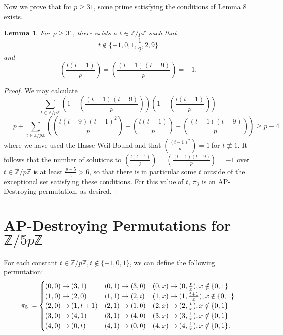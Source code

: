 \documentclass[12pt]{amsart}
\newtheorem{lemma}[thm]{Lemma}
\theoremstyle{definition}
\theoremstyle{remark}
\newcommand{\Z}{\mathbb Z}
\begin{document}
Now we prove that for $p\ge 31$, some prime satisfying the conditions of Lemma 8 exists. 
\begin{lemma}
For $p\ge 31$, there exists a $t\in \Z/p\Z$ such that
\[t\notin \{-1, 0, 1, \frac{1}{2}, 2, 9\}\]
and 
\[(\frac{t(t-1)}{p})=(\frac{(t-1)(t-9)}{p})=-1.\]
\end{lemma}
\begin{proof}
We may calculate
\[
\sum_{t\in\Z/p\Z}(1-(\frac{(t-1)(t-9)}{p}))(1-(\frac{t(t-1)}{p}))\]\[= p+\sum_{t\in\Z/p\Z}((\frac{t(t-9)(t-1)^2}{p})-(\frac{t(t-1)}{p})-(\frac{(t-1)(t-9)}{p}))\ge p-4
\]
where we have used the Hasse-Weil Bound and that $(\frac{(t-1)^2}{p})=1$ for $t\nequiv 1$.
It follows that the number of solutions to $(\frac{t(t-1)}{p})=(\frac{(t-1)(t-9)}{p})=-1$ over $t\in\Z/p\Z$ is at least $\frac{p-5}{4}>6$, so that there is in particular some $t$ outside of the exceptional set satisfying these conditions. For this value of $t$, $\pi_3$ is an AP-Destroying permutation, as desired.
\end{proof}
\section{AP-Destroying Permutations for $\Z/5p\Z$}
For each constant $t\in \Z/p\Z, t\notin\{-1, 0, 1\}$, we can define the following permutation:\[\pi_5 :=  \setlength{\arraycolsep}{0pt}
\renewcommand{\arraystretch}{1.2}
\left\{\begin{array}{l @{\quad} l @{\quad}l}
      (0, 0)\to (3, 1) & (0, 1)\to (3, 0) & (0, x)\to (0, \frac{t}{x}), x\notin\{0, 1\}
      \\ (1, 0)\to (2, 0) & (1, 1)\to (2, t) & (1, x)\to (1, \frac{t+1}{x}), x\notin\{0, 1\}
      \\ (2, 0)\to (1, t+1) & (2, 1)\to (1, 0) & (2, x)\to (2, \frac{t}{x}), x\notin\{0, 1\}
      \\ (3, 0)\to (4, 1) & (3, 1)\to (4, 0) & (3, x)\to (3, \frac{1}{x}), x\notin\{0, 1\}
      \\ (4, 0)\to (0, t) & (4, 1)\to (0, 0) & (4, x)\to (4, \frac{1}{x}), x\notin\{0, 1\}.
\end{array}\right.\]
\end{document}
